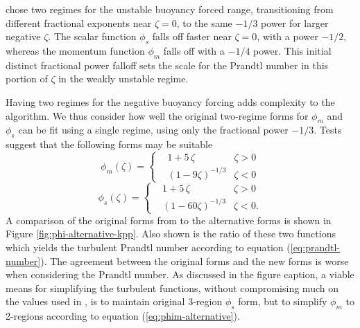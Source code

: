 \cite{LargeKPP} chose two regimes for the unstable buoyancy forced
range, transitioning from different fractional exponents near $\zeta =
0$, to the same $-1/3$ power for larger negative $\zeta$.  The scalar
function $\phi_{s}$ falls off faster near $\zeta=0$, with a power
$-1/2$, whereas the momentum function $\phi_{m}$ falls off with a
$-1/4$ power.  This initial distinct fractional power falloff sets the
scale for the Prandtl number in this portion of $\zeta$ in the weakly
unstable regime.

Having two regimes for the negative buoyancy forcing adds complexity
to the algorithm.  We thus consider how well the original two-regime
forms for $\phi_{m}$ and $\phi_{s}$ can be fit using a single regime,
using only the fractional power $-1/3$.  Tests suggest that the
following forms may be suitable
\begin{equation}
   \phi_{m}(\zeta) = \left\{
 \begin{array}{lll}
  &1 + 5 \, \zeta      &\zeta > 0 \\
  &(1-9\zeta)^{-1/3}  &\zeta < 0 
 \end{array}
 \right.
\label{eq:phim-alternative}
\end{equation}
\begin{equation}
   \phi_{s}(\zeta) = \left\{
 \begin{array}{lll}
  &1 + 5 \, \zeta      &\zeta > 0 \\
  &(1-60\zeta)^{-1/3}  &\zeta < 0. 
 \end{array}
 \right.
\label{eq:phis-alternative}
\end{equation}
A comparison of the original forms from \cite{LargeKPP} to the
alternative forms is shown in Figure
\ref{fig:phi-alternative-kpp}. Also shown is the ratio of these two
functions which yields the turbulent Prandtl number according to
equation (\ref{eq:prandtl-number}).  The agreement between the
original forms and the new forms is worse when considering the Prandtl
number.  As discussed in the figure caption, a viable means for
simplifying the turbulent functions, without compromising much on the
values used in \cite{LargeKPP}, is to maintain original 3-region
$\phi_{s}$ form, but to simplify $\phi_{m}$ to 2-regions according to
equation (\ref{eq:phim-alternative}).


